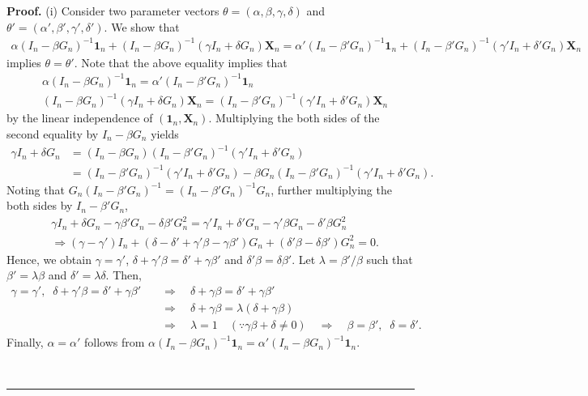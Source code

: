 \documentclass[10.5pt, A4paper, openany, uplatex]{book}
\newcommand{\mbf}{\mathbf}
\newenvironment{proof}[1][Proof]{\textbf{#1.} }{\  \rule{0.5em}{0.5em}}
\numberwithin{equation}{section}
\begin{document}
\begin{proof}
	(i) Consider two parameter vectors $\theta = (\alpha, \beta, \gamma, \delta)$ and $\theta' = (\alpha', \beta', \gamma', \delta')$.
	We show that
	\begin{align}\label{eq:ident1}
	\alpha (I_n - \beta G_n)^{-1}\mathbf{1}_n  + (I_n - \beta G_n)^{-1}( \gamma I_n + \delta G_n ) \mbf{X}_n = \alpha' (I_n - \beta' G_n)^{-1}\mathbf{1}_n  + (I_n - \beta' G_n)^{-1}( \gamma' I_n + \delta' G_n ) \mbf{X}_n
	\end{align}
	implies $\theta = \theta'$.
	Note that the above equality implies that 
	\begin{align*}
	& \alpha (I_n - \beta G_n)^{-1}\mathbf{1}_n = \alpha' (I_n - \beta' G_n)^{-1}\mathbf{1}_n\\
	& (I_n - \beta G_n)^{-1}( \gamma I_n + \delta G_n ) \mbf{X}_n = (I_n - \beta' G_n)^{-1}( \gamma' I_n + \delta' G_n ) \mbf{X}_n
	\end{align*}
	by the linear independence of $(\mbf{1}_n, \mbf{X}_n)$.
	Multiplying the both sides of the second equality by $I_n - \beta G_n$ yields
	\begin{align*}
	\gamma I_n + \delta G_n 
	& = (I_n - \beta G_n) (I_n - \beta' G_n)^{-1}( \gamma' I_n + \delta' G_n ) \\
	& = (I_n - \beta' G_n)^{-1}( \gamma' I_n + \delta' G_n )  - \beta G_n(I_n - \beta' G_n)^{-1}( \gamma' I_n + \delta' G_n ).
	\end{align*}
	Noting that $G_n(I_n - \beta' G_n)^{-1} = (I_n - \beta' G_n)^{-1} G_n$, further multiplying the both sides by $I_n - \beta' G_n$,
	\begin{align}
	& \gamma I_n + \delta G_n - \gamma \beta' G_n - \delta \beta' G_n^2 =  \gamma' I_n + \delta' G_n   - \gamma' \beta G_n   - \delta' \beta G_n^2 \nonumber \\
	& \Longrightarrow (\gamma - \gamma') I_n + (\delta - \delta' + \gamma'\beta - \gamma\beta' )G_n + (\delta'\beta - \delta\beta') G_n^2 =0. \label{eq:ident2}
	\end{align}
	Hence, we obtain $\gamma = \gamma'$, $\delta  + \gamma'\beta = \delta' + \gamma\beta'$ and $\delta'\beta = \delta\beta'$.
	Let $\lambda = \beta'/\beta$ such that $\beta' = \lambda \beta$ and $\delta' = \lambda \delta$.
	Then, 
	\begin{align*}
	\gamma = \gamma',\;\; \delta  + \gamma'\beta = \delta' + \gamma\beta' \quad 
	& \Longrightarrow\quad \delta  + \gamma \beta = \delta' + \gamma\beta' \\
	& \Longrightarrow \quad \delta  + \gamma \beta = \lambda (\delta + \gamma \beta) \\
	& \Longrightarrow \quad \lambda = 1 \quad (\because \gamma \beta + \delta \neq 0) \quad \Longrightarrow \quad \beta = \beta', \;\; \delta = \delta'.
	\end{align*}
	Finally, $\alpha = \alpha'$ follows from $\alpha (I_n - \beta G_n)^{-1}\mathbf{1}_n = \alpha' (I_n - \beta G_n)^{-1}\mathbf{1}_n$.
	

\end{proof}
\end{document}
